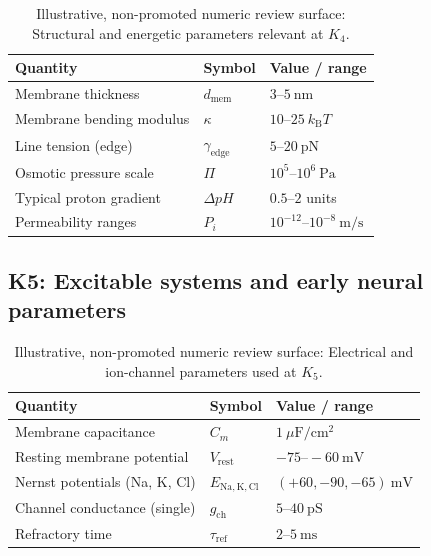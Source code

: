 \begin{table}[htbp]
  \centering
  \caption{Illustrative, non-promoted numeric review surface: Structural and energetic parameters relevant at \(K_4\).}
  \label{tab:k4-membrane-parameters}
  \begin{tabular}{@{}L{0.44\textwidth}L{0.16\textwidth}L{0.23\textwidth}@{}}
    \hline
    Quantity & Symbol & Value / range \\
    \hline
    Membrane thickness & \(d_\mathrm{mem}\)
        & \(3\text{–}5~\mathrm{nm}\) \\
    Membrane bending modulus & \(\kappa\)
        & \(10\text{–}25~k_\mathrm{B}T\) \\
    Line tension (edge) & \(\gamma_\mathrm{edge}\)
        & \(5\text{–}20~\mathrm{pN}\) \\
    Osmotic pressure scale & \(\Pi\)
        & \(10^5\text{–}10^6~\mathrm{Pa}\) \\
    Typical proton gradient & \(\Delta pH\)
        & \(0.5\text{–}2\) units \\
    Permeability ranges & \(P_i\)
        & \(10^{-12}\text{–}10^{-8}~\mathrm{m/s}\) \\
    \hline
  \end{tabular}
\end{table}


\subsection*{K5: Excitable systems and early neural parameters}

\begin{table}[htbp]
  \centering
  \caption{Illustrative, non-promoted numeric review surface: Electrical and ion-channel parameters used at \(K_5\).}
  \label{tab:k5-excitable-parameters}
  \begin{tabular}{@{}L{0.44\textwidth}L{0.16\textwidth}L{0.23\textwidth}@{}}
    \hline
    Quantity & Symbol & Value / range \\
    \hline
    Membrane capacitance & \(C_m\)
        & \(1~\mu\mathrm{F/cm^2}\) \\
    Resting membrane potential & \(V_\mathrm{rest}\)
        & \(-75\text{–}-60~\mathrm{mV}\) \\
    Nernst potentials (Na, K, Cl) &
        \(E_{\mathrm{Na,K,Cl}}\)
        & \((+60, -90, -65)~\mathrm{mV}\) \\
    Channel conductance (single) & \(g_\mathrm{ch}\)
        & \(5\text{–}40~\mathrm{pS}\) \\
    Refractory time & \(\tau_\mathrm{ref}\)
        & \(2\text{–}5~\mathrm{ms}\) \\
    \hline
  \end{tabular}
\end{table}

